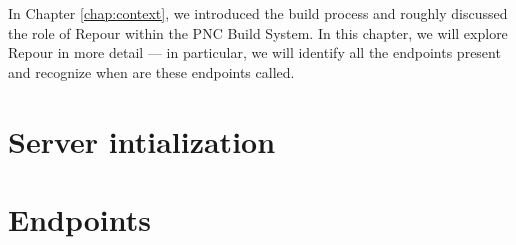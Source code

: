 \documentclass[../../main.tex]{subfiles}
\begin{document}
In Chapter \ref{chap:context}, we introduced the build process and roughly discussed the role of Repour within the PNC Build System. In this chapter, we will explore Repour\cite{repour} in more detail — in particular, we will identify all the endpoints present and recognize when are these endpoints called.

\section{Server intialization}


\section{Endpoints}
\label{section:endpoints}

\end{document}
